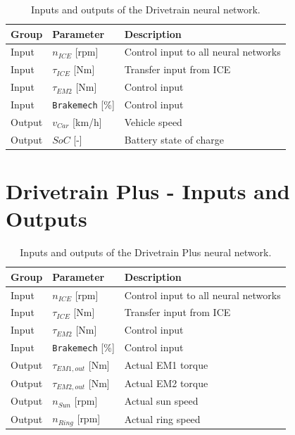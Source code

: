 \begin{table}[H]
  \centering
  \begin{tabular}{|l|l|l|}
    \hline
    \textbf{Group} & \textbf{Parameter} & \textbf{Description} \\
    \hline
    Input & $n_{ICE}$ [rpm] & Control input to all neural networks \\
    Input & $\tau_{ICE}$ [Nm] & Transfer input from ICE \\
    Input & $\tau_{EM2}$ [Nm] & Control input \\
    Input & \texttt{Brakemech} [\%] & Control input \\
    Output & $v_{Car}$ [km/h] & Vehicle speed \\
    Output & $SoC$ [-] & Battery state of charge \\
    \hline
  \end{tabular}
  \caption[Drivetrain neural-network inputs and outputs]{Inputs and outputs of the Drivetrain neural network.}
  \label{tab:drivetrain_io}
\end{table}

\section{Drivetrain Plus - Inputs and Outputs}

\begin{table}[H]
  \centering
  \begin{tabular}{|l|l|l|}
    \hline
    \textbf{Group} & \textbf{Parameter} & \textbf{Description} \\
    \hline
    Input & $n_{ICE}$ [rpm] & Control input to all neural networks \\
    Input & $\tau_{ICE}$ [Nm] & Transfer input from ICE \\
    Input & $\tau_{EM2}$ [Nm] & Control input \\
    Input & \texttt{Brakemech} [\%] & Control input \\
    Output & $\tau_{EM1,out}$ [Nm] & Actual EM1 torque \\
    Output & $\tau_{EM2,out}$ [Nm] & Actual EM2 torque \\
    Output & $n_{Sun}$ [rpm] & Actual sun speed \\
    Output & $n_{Ring}$ [rpm] & Actual ring speed \\
    \hline
  \end{tabular}
  \caption[Drivetrain Plus neural-network inputs and outputs]{Inputs and outputs of the Drivetrain Plus neural network.}
  \label{tab:drivetrain_plus_io}
\end{table}

